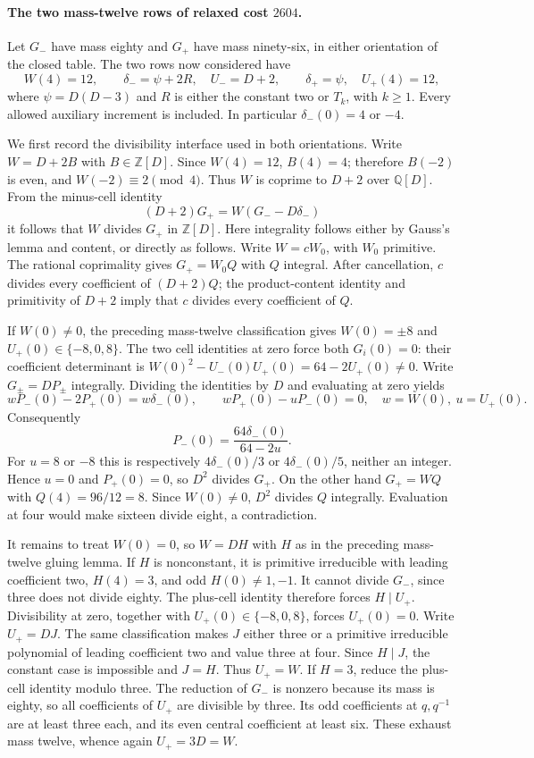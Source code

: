 \paragraph{The two mass-twelve rows of relaxed cost $2604$.}
Let $G_-$ have mass eighty and $G_+$ have mass ninety-six,
in either orientation of the closed table. The two rows now considered have
\[
 W(4)=12,\qquad \delta_- =\psi+2R,\quad U_-=D+2,
 \qquad \delta_+=\psi,\quad U_+(4)=12,
\]
where $\psi=D(D-3)$ and $R$ is either the constant two or $T_k$,
with $k\ge1$. Every allowed auxiliary increment is included.
In particular $\delta_-(0)=4$ or $-4$.

We first record the divisibility interface used in both orientations.
Write $W=D+2B$ with $B\in\mathbb Z[D]$. Since $W(4)=12$,
$B(4)=4$; therefore $B(-2)$ is even, and
$W(-2)\equiv2\pmod4$. Thus $W$ is coprime to $D+2$
over $\mathbb Q[D]$. From the minus-cell identity
\[
                 (D+2)G_+=W(G_--D\delta_-)
\]
it follows that $W$ divides $G_+$ in $\mathbb Z[D]$.
Here integrality follows either by Gauss's lemma and content,
or directly as follows. Write $W=cW_0$, with $W_0$ primitive.
The rational coprimality gives $G_+=W_0Q$ with $Q$ integral.
After cancellation, $c$ divides every coefficient of $(D+2)Q$;
the product-content identity and primitivity of $D+2$ imply
that $c$ divides every coefficient of $Q$.

If $W(0)\ne0$, the preceding mass-twelve classification gives
$W(0)=\pm8$ and $U_+(0)\in\{-8,0,8\}$.
The two cell identities at zero force both $G_i(0)=0$:
their coefficient determinant is
$W(0)^2-U_-(0)U_+(0)=64-2U_+(0)\ne0$.
Write $G_\pm=DP_\pm$ integrally. Dividing the identities by
$D$ and evaluating at zero yields
\[
 wP_-(0)-2P_+(0)=w\delta_-(0),\qquad
 wP_+(0)-uP_-(0)=0,
 \quad w=W(0),\ u=U_+(0).
\]
Consequently
\[
 P_-(0)=\frac{64\delta_-(0)}{64-2u}.
\]
For $u=8$ or $-8$ this is respectively
$4\delta_-(0)/3$ or $4\delta_-(0)/5$, neither an integer.
Hence $u=0$ and $P_+(0)=0$, so $D^2$ divides $G_+$.
On the other hand $G_+=WQ$ with $Q(4)=96/12=8$.
Since $W(0)\ne0$, $D^2$ divides $Q$ integrally.
Evaluation at four would make sixteen divide eight, a contradiction.

It remains to treat $W(0)=0$, so $W=DH$ with $H$ as in
the preceding mass-twelve gluing lemma. If $H$ is nonconstant,
it is primitive irreducible with leading coefficient two,
$H(4)=3$, and odd $H(0)\ne1,-1$.
It cannot divide $G_-$, since three does not divide eighty.
The plus-cell identity therefore forces $H\mid U_+$.
Divisibility at zero, together with $U_+(0)\in\{-8,0,8\}$,
forces $U_+(0)=0$. Write $U_+=DJ$.
The same classification makes $J$ either three or a primitive
irreducible polynomial of leading coefficient two and value three
at four. Since $H\mid J$, the constant case is impossible and
$J=H$. Thus $U_+=W$.
If $H=3$, reduce the plus-cell identity modulo three.
The reduction of $G_-$ is nonzero because its mass is eighty,
so all coefficients of $U_+$ are divisible by three.
Its odd coefficients at $q,q^{-1}$ are at least three each,
and its even central coefficient at least six. These exhaust
mass twelve, whence again $U_+=3D=W$.

